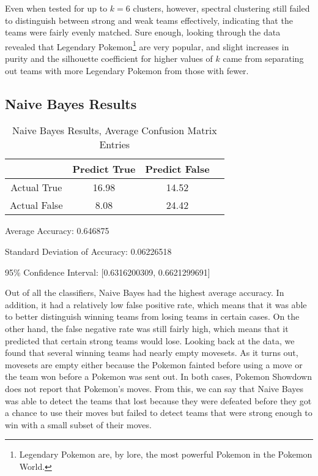 \documentclass{acm_proc_article-sp}
\begin{document}
Even when tested for up to $k=6$ clusters, however, spectral clustering still failed to distinguish between strong and weak teams effectively, indicating that the teams were fairly evenly matched. Sure enough, looking through the data revealed that Legendary Pokemon\footnote{Legendary Pokemon are, by lore, the most powerful Pokemon in the Pokemon World.} are very popular, and slight increases in purity and the silhouette coefficient for higher values of $k$ came from separating out teams with more Legendary Pokemon from those with fewer.

\subsection{Naive Bayes Results}

\begin{table}

\centering

\caption{Naive Bayes Results, Average Confusion Matrix Entries}

\begin{tabular}{|c|c|c|l|} \hline

 & Predict True & Predict False \\ \hline
Actual True & 16.98 & 14.52 \\ \hline
Actual False & 8.08 & 24.42 \\ \hline

\end{tabular}

\end{table}

Average Accuracy: 0.646875

Standard Deviation of Accuracy: 0.06226518

95\% Confidence Interval: [0.6316200309, 0.6621299691]

Out of all the classifiers, Naive Bayes had the highest average accuracy. In addition, it had a relatively low false positive rate, which means that it was able to better distinguish winning teams from losing teams in certain cases. On the other hand, the false negative rate was still fairly high, which means that it predicted that certain strong teams would lose. Looking back at the data, we found that several winning teams had nearly empty movesets. As it turns out, movesets are empty either because the Pokemon fainted before using a move or the team won before a Pokemon was sent out. In both cases, Pokemon Showdown does not report that Pokemon's moves. From this, we can say that Naive Bayes was able to detect the teams that lost because they were defeated before they got a chance to use their moves but failed to detect teams that were strong enough to win with a small subset of their moves.
\end{document}
